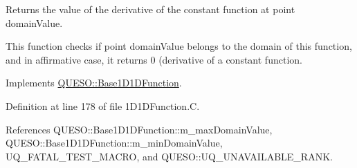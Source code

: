 Returns the value of the derivative of the constant function at point {\ttfamily domain\-Value}. 

This function checks if point {\ttfamily domain\-Value} belongs to the domain of {\ttfamily this} function, and in affirmative case, it returns 0 (derivative of a constant function. 

Implements \hyperlink{class_q_u_e_s_o_1_1_base1_d1_d_function_a6b8de03f2099f31735dcaf15c24bca32}{Q\-U\-E\-S\-O\-::\-Base1\-D1\-D\-Function}.



Definition at line 178 of file 1\-D1\-D\-Function.\-C.



References Q\-U\-E\-S\-O\-::\-Base1\-D1\-D\-Function\-::m\-\_\-max\-Domain\-Value, Q\-U\-E\-S\-O\-::\-Base1\-D1\-D\-Function\-::m\-\_\-min\-Domain\-Value, U\-Q\-\_\-\-F\-A\-T\-A\-L\-\_\-\-T\-E\-S\-T\-\_\-\-M\-A\-C\-R\-O, and Q\-U\-E\-S\-O\-::\-U\-Q\-\_\-\-U\-N\-A\-V\-A\-I\-L\-A\-B\-L\-E\-\_\-\-R\-A\-N\-K.



